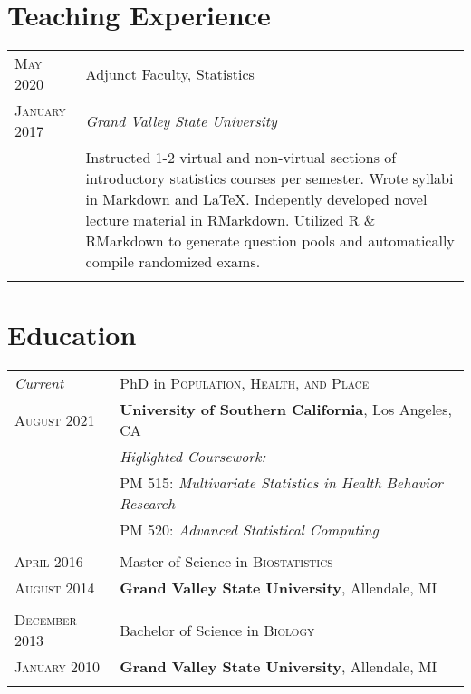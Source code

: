 \documentclass[a4paper,10pt]{article}
\begin{document}
\section{Teaching Experience}
\begin{tabular}{>{\raggedleft\arraybackslash}p{2.8cm}|p{12cm}}

 \textsc{May 2020} & Adjunct Faculty, Statistics \\
 \textsc{January 2017}&\emph{Grand Valley State University}\\&
 \footnotesize{Instructed 1-2 virtual and non-virtual sections of introductory statistics courses per semester. Wrote syllabi in Markdown and \LaTeX. Indepently developed novel lecture material in RMarkdown. Utilized R \& RMarkdown to generate question pools and automatically compile randomized exams. }\\\multicolumn{2}{c}{} \\

 \end{tabular}
 
 
 
 
\section{Education}
\begin{tabular}{>{\raggedleft\arraybackslash}p{2.8cm} p{12cm}}	
\emph{Current} & PhD in \textsc{Population, Health, and Place} \\ 
\textsc{August 2021}& \textbf{University of Southern California}, Los Angeles, CA \\ 
& \footnotesize{\emph{Higlighted Coursework:} }\\
& \footnotesize{PM 515: \emph{Multivariate Statistics in Health Behavior Research}} \\
& \footnotesize{PM 520: \emph{Advanced Statistical Computing}} \\ & \\

 \textsc{April 2016} & Master of Science in \textsc{Biostatistics} \\
 \textsc{August 2014} & \textbf{Grand Valley State University}, Allendale, MI\\ & \\

 \textsc{December 2013} & Bachelor of Science in \textsc{Biology} \\
 \textsc{January 2010} & \textbf{Grand Valley State University}, Allendale, MI\\ & \\ 
 
 \end{tabular}
\end{document}
